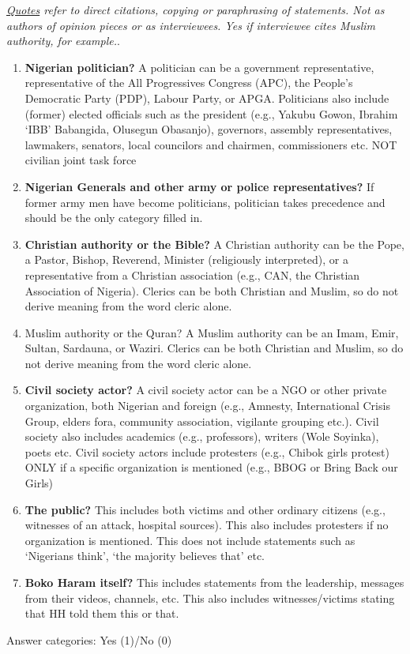\textit{\underline{Quotes} refer to direct citations, copying or paraphrasing of statements. Not as authors of opinion pieces or as interviewees. Yes if interviewee cites Muslim authority, for example.}.

\begin{enumerate}[noitemsep, font=\bfseries]
    \item \textbf{Nigerian politician?} A politician can be a government representative, representative of the All Progressives Congress (APC), the People’s Democratic Party (PDP), Labour Party, or APGA. Politicians also include (former) elected officials such as the president (e.g., Yakubu Gowon, Ibrahim ‘IBB’ Babangida, Olusegun Obasanjo), governors, assembly representatives, lawmakers, senators, local councilors and chairmen, commissioners etc. NOT civilian joint task force
    \item \textbf{Nigerian Generals and other army or police representatives?} If former army men have become politicians, politician takes precedence and should be the only category filled in.
    \item \textbf{Christian authority or the Bible?} A Christian authority can be the Pope, a Pastor, Bishop, Reverend, Minister (religiously interpreted), or a representative from a Christian association (e.g., CAN, the Christian Association of Nigeria). Clerics can be both Christian and Muslim, so do not derive meaning from the word cleric alone.
    \item Muslim authority or the Quran? A Muslim authority can be an Imam, Emir, Sultan, Sardauna, or Waziri. Clerics can be both Christian and Muslim, so do not derive meaning from the word cleric alone.
    \item\textbf{ Civil society actor? }A civil society actor can be a NGO or other private organization, both Nigerian and foreign (e.g., Amnesty, International Crisis Group, elders fora, community association, vigilante grouping etc.). Civil society also includes academics (e.g., professors), writers (Wole Soyinka), poets etc. Civil society actors include protesters (e.g., Chibok girls protest) ONLY if a specific organization is mentioned (e.g., BBOG or Bring Back our Girls)
    \item \textbf{The public?} This includes both victims and other ordinary citizens (e.g., witnesses of an attack, hospital sources). This also includes protesters if no organization is mentioned. This does not include statements such as ‘Nigerians think’, ‘the majority believes that’ etc.
    \item \textbf{Boko Haram itself?} This includes statements from the leadership, messages from their videos, channels, etc. This also includes witnesses/victims stating that HH told them this or that.
\end{enumerate}

Answer categories: Yes (1)/No (0)
